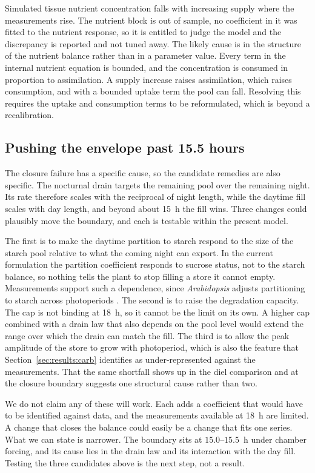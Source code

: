 Simulated tissue nutrient concentration falls with increasing supply where the
measurements rise. The nutrient block is out of sample, no coefficient in it
was fitted to the nutrient response, so it is entitled to judge the model and
the discrepancy is reported and not tuned away. The likely cause is in the
structure of the nutrient balance rather than in a parameter value. Every term in
the internal nutrient equation is bounded, and the concentration is consumed in
proportion to assimilation. A supply increase raises assimilation,
which raises consumption, and with a bounded uptake term the pool can fall.
Resolving this requires the uptake and consumption terms to be reformulated,
which is beyond a recalibration.

\subsection{Pushing the envelope past 15.5 hours}

The closure failure has a specific cause, so the candidate remedies are also
specific. The nocturnal drain targets the remaining pool over the remaining
night. Its rate therefore scales with the reciprocal of night length, while the
daytime fill scales with day length, and beyond about 15~h the fill wins. Three
changes could plausibly move the boundary, and each is testable within the
present model.

The first is to make the daytime partition to starch respond to the size of the
starch pool relative to what the coming night can export. In the current
formulation the partition coefficient responds to sucrose status, not to the
starch balance, so nothing tells the plant to stop filling a store it cannot
empty. Measurements support such a dependence, since \textit{Arabidopsis}
adjusts partitioning to starch across photoperiods
\citep{Sulpice2014,Mengin2017}. The second is to raise the degradation
capacity. The cap is not binding at 18~h, so it cannot be the limit on its own.
A higher cap combined with a drain law that also depends on the pool level would
extend the range over which the drain can match the fill. The third
is to allow the peak amplitude of the store to grow with photoperiod, which is
also the feature that Section~\ref{sec:results:carb} identifies as
under-represented against the measurements. That the same shortfall shows up in
the diel comparison and at the closure boundary suggests one structural cause
rather than two.

We do not claim any of these will work. Each adds a coefficient that would have
to be identified against data, and the measurements available at 18~h are
limited. A change that closes the balance could easily be a change that fits one
series. What we can state is narrower. The boundary sits at $15.0$--$15.5$~h under
chamber forcing, and its cause lies in the drain law and its interaction with
the day fill. Testing the three candidates above is the next step, not a
result.

